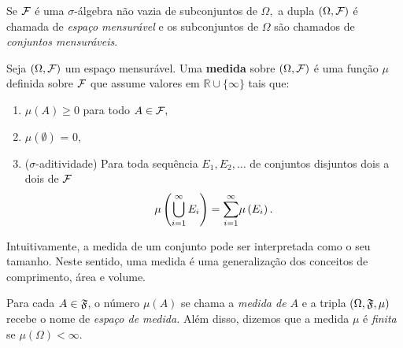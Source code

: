 \begin{frame}
\begin{defi}
Se ${\cal F}$ é uma $\sigma$-álgebra
não vazia de subconjuntos de $\Omega,$  a dupla $(\Omega, {\cal F})$ é chamada
de {\it espaço mensurável} e os subconjuntos de $\Omega$ são chamados de
{\it conjuntos mensuráveis}. 
\end{defi}



\begin{defi}[Medida] Seja  $(\Omega, {\cal F})$  um espaço mensurável. Uma {\bf medida} sobre  $(\Omega, {\cal F})$  é uma função $\mu$ 
definida sobre ${\cal F}$ que assume valores em $\mathbb{R} \cup \{\infty\}$ tais que:
\begin{enumerate}
\item  $\mu (A) \geq 0$ para todo $A \in {\cal F},$

\item  $\mu(\emptyset)$ = 0,
\item  ($\sigma$-aditividade)   Para toda sequência $E_{1},E_{2},\ldots$ de conjuntos disjuntos dois a dois de ${\cal F} $ $$\mu \left( \bigcup _{i=1}^{\infty }E_{i}\right) =\overset{\infty }{%
\underset{i=1}{\sum }}\mu \left( E_{i}\right) .$$ 
\end{enumerate}
\end{defi}

Intuitivamente, a medida de um conjunto pode ser interpretada como o seu tamanho. Neste sentido, uma medida é uma generalização dos conceitos de comprimento, área e volume.

\begin{nota}
Para cada $A\in \frak{F}$,  o número $\mu \left( A\right) $ se chama a {\it medida de $A$} e a tripla $\left( \Omega ,\frak{F,\mu }\right) $ recebe o nome de
{\it espaço de medida.} Além disso, dizemos que a medida $\mu $ é {\it finita} se $\mu \left( \Omega \right) <\infty .$
\end{nota}
 
\end{frame}

